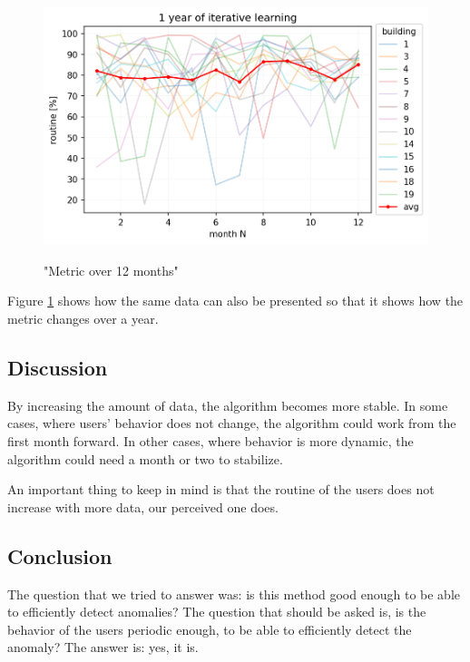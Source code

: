 \begin{figure}[H]
	\centering
	\caption{"Metric over 12 months"}
	\includegraphics[width=.7\textwidth]{Figures/EC/DYN/1_year_of_iterative_learning_avg.png}
	\label{fig:1_year_of_iterative_learning_avg}
\end{figure}

Figure \ref{fig:1_year_of_iterative_learning_avg} shows how the same data can also be presented so that it shows how the metric changes over a year.

\subsection{Discussion}

By increasing the amount of data, the algorithm becomes more stable.
In some cases, where users' behavior does not change, the algorithm could work
from the first month forward. In other cases, where behavior is more dynamic, 
the algorithm could need a month or two to stabilize. 

An important thing to keep in mind is that the routine of the users does not increase with more data,
our perceived one does. 

\subsection{Conclusion}

The question that we tried to answer was:
is this method good enough to be able to efficiently detect anomalies? 
The question that should be asked is,
is the behavior of the users periodic enough, to 
be able to efficiently detect the anomaly?
The answer is: yes, it is.


